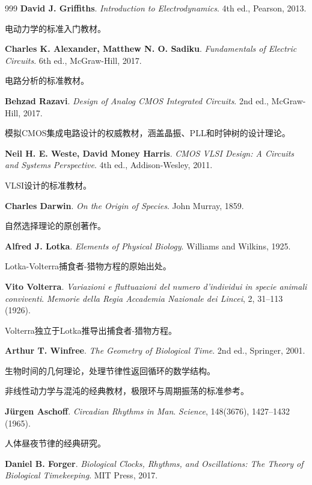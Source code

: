 \begin{thebibliography}{999}
 \textbf{David J. Griffiths}. \textit{Introduction to Electrodynamics}. 4th ed., Pearson, 2013.

电动力学的标准入门教材。

 \textbf{Charles K. Alexander, Matthew N. O. Sadiku}. \textit{Fundamentals of Electric Circuits}. 6th ed., McGraw-Hill, 2017.

电路分析的标准教材。

 \textbf{Behzad Razavi}. \textit{Design of Analog CMOS Integrated Circuits}. 2nd ed., McGraw-Hill, 2017.

模拟CMOS集成电路设计的权威教材，涵盖晶振、PLL和时钟树的设计理论。

 \textbf{Neil H. E. Weste, David Money Harris}. \textit{CMOS VLSI Design: A Circuits and Systems Perspective}. 4th ed., Addison-Wesley, 2011.

VLSI设计的标准教材。

 \textbf{Charles Darwin}. \textit{On the Origin of Species}. John Murray, 1859.

自然选择理论的原创著作。

 \textbf{Alfred J. Lotka}. \textit{Elements of Physical Biology}. Williams and Wilkins, 1925.

Lotka-Volterra捕食者-猎物方程的原始出处。

 \textbf{Vito Volterra}. \textit{Variazioni e fluttuazioni del numero d'individui in specie animali conviventi}. \textit{Memorie della Regia Accademia Nazionale dei Lincei}, 2, 31--113 (1926).

Volterra独立于Lotka推导出捕食者-猎物方程。

 \textbf{Arthur T. Winfree}. \textit{The Geometry of Biological Time}. 2nd ed., Springer, 2001.

生物时间的几何理论，处理节律性返回循环的数学结构。



非线性动力学与混沌的经典教材，极限环与周期振荡的标准参考。

 \textbf{J\"urgen Aschoff}. \textit{Circadian Rhythms in Man}. \textit{Science}, 148(3676), 1427--1432 (1965).

人体昼夜节律的经典研究。

 \textbf{Daniel B. Forger}. \textit{Biological Clocks, Rhythms, and Oscillations: The Theory of Biological Timekeeping}. MIT Press, 2017.


\end{thebibliography}

